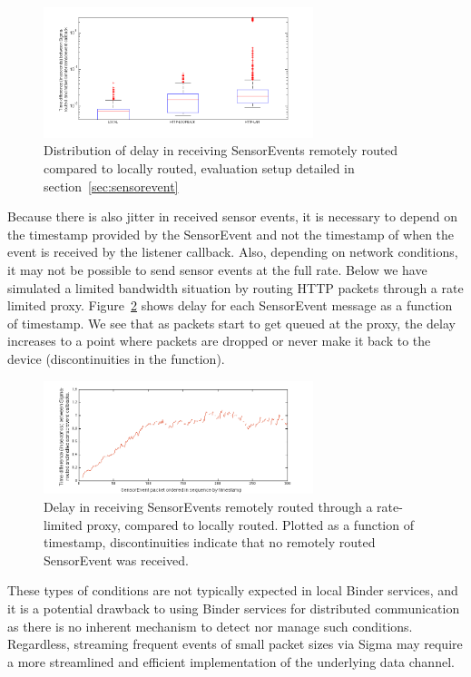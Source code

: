 \documentclass[prodmode]{acmlarge}
\begin{document}
\begin{figure}[h]
\centering
\includegraphics[width=0.7\textwidth]{plots/sensorevent_delay.png}
\caption{Distribution of delay in receiving SensorEvents remotely routed compared to locally routed, evaluation setup detailed in section~\ref{sec:sensorevent}}
\label{fig:sensorevent}
\end{figure}

Because there is also jitter in received sensor events, it is necessary to depend on the timestamp provided by the SensorEvent and not the timestamp of when the event is received by the listener callback. Also, depending on network conditions, it may not be possible to send sensor events at the full rate. Below we have simulated a limited bandwidth situation by routing HTTP packets through a rate limited proxy. Figure~\ref{fig:jitter} shows delay for each SensorEvent message as a function of timestamp. We see that as packets start to get queued at the proxy, the delay increases to a point where packets are dropped or never make it back to the device (discontinuities in the function).

\begin{figure}[h]
\centering
\includegraphics[width=0.7\textwidth]{plots/limited_bandwidth_increasing_latency.png}
\caption{Delay in receiving SensorEvents remotely routed through a rate-limited proxy, compared to locally routed. Plotted as a function of timestamp, discontinuities indicate that no remotely routed SensorEvent was received.}
\label{fig:jitter}
\end{figure}

These types of conditions are not typically expected in local Binder services, and it is a potential drawback to using Binder services for distributed communication as there is no inherent mechanism to detect nor manage such conditions. Regardless, streaming frequent events of small packet sizes via Sigma may require a more streamlined and efficient implementation of the underlying data channel.
\end{document}
